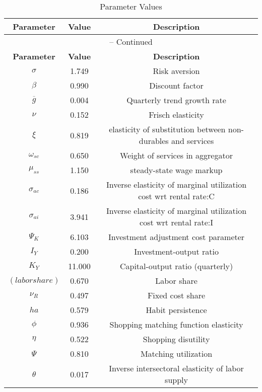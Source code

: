 \begin{center}
\begin{longtable}{ccc}
\caption{Parameter Values}\\%
\toprule%
\multicolumn{1}{c}{\textbf{Parameter}} &
\multicolumn{1}{c}{\textbf{Value}} &
 \multicolumn{1}{c}{\textbf{Description}}\\%
\midrule%
\endfirsthead
\multicolumn{3}{c}{{\tablename} \thetable{} -- Continued}\\%
\midrule%
\multicolumn{1}{c}{\textbf{Parameter}} &
\multicolumn{1}{c}{\textbf{Value}} &
  \multicolumn{1}{c}{\textbf{Description}}\\%
\midrule%
\endhead
${\sigma}$ 	 & 	 1.749 	 & 	 Risk aversion\\
${\beta}$ 	 & 	 0.990 	 & 	 Discount factor\\
${\overline{g}}$ 	 & 	 0.004 	 & 	 Quarterly trend growth rate\\
$\nu$ 	 & 	 0.152 	 & 	 Frisch elasticity\\
$\xi$ 	 & 	 0.819 	 & 	 elasticity of substitution between non-durables and services\\
$\omega_{sc}$ 	 & 	 0.650 	 & 	 Weight of services in aggregator\\
$\mu_{ss}$ 	 & 	 1.150 	 & 	 steady-state wage markup\\
${\sigma_{ac}}$ 	 & 	 0.186 	 & 	 Inverse elasticity of marginal utilization cost wrt rental rate:C\\
${\sigma_{ai}}$ 	 & 	 3.941 	 & 	 Inverse elasticity of marginal utilization cost wrt rental rate:I\\
${\Psi_{K}}$ 	 & 	 6.103 	 & 	 Investment adjustment cost parameter\\
${I_Y}$ 	 & 	 0.200 	 & 	 Investment-output ratio\\
${K_Y}$ 	 & 	 11.000 	 & 	 Capital-output ratio (quarterly)\\
$(labor share)$ 	 & 	 0.670 	 & 	 Labor share\\
${\nu_R}$ 	 & 	 0.497 	 & 	 Fixed cost share\\
${ha}$ 	 & 	 0.579 	 & 	 Habit persistence\\
${\phi}$ 	 & 	 0.936 	 & 	 Shopping matching function elasticity\\
${\eta}$ 	 & 	 0.522 	 & 	 Shopping disutility\\
${\Psi}$ 	 & 	 0.810 	 & 	 Matching utilization\\
${\theta}$ 	 & 	 0.017 	 & 	 Inverse intersectoral elasticity of labor supply\\

\end{longtable}
\end{center}
